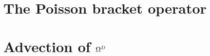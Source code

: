 \documentclass[12pt,a4paper,oneside,openright]{report} %
\begin{document}
\chapter{The Poisson bracket operator}
\label{app:poisson}


\chapter{Advection of \texorpdfstring{$\Omega^D$}{OmegaD}}
\label{app:vortDAdv}




\end{document}

